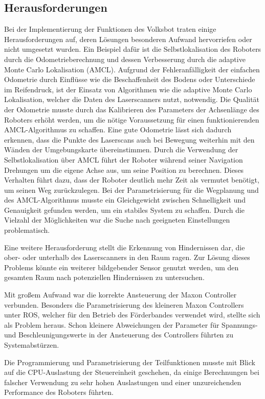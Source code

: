 \subsection{Herausforderungen}

Bei der Implementierung der Funktionen des Volksbot traten einige Herausforderungen auf, deren Lösungen besonderen Aufwand hervorriefen oder nicht umgesetzt wurden. Ein Beispiel dafür ist die Selbstlokalisation des Roboters durch die Odometrieberechnung und dessen Verbesserung durch die adaptive Monte Carlo Lokalisation (AMCL). Aufgrund der Fehleranfälligkeit der einfachen Odometrie durch Einflüsse wie die Beschaffenheit des Bodens oder Unterschiede im Reifendruck, ist der Einsatz von Algorithmen wie die adaptive Monte Carlo Lokalisation, welcher die Daten des Laserscanners nutzt, notwendig.  Die Qualität der Odometrie musste durch das Kalibrieren des Parameters der Achsenlänge des Roboters erhöht werden, um die nötige Voraussetzung für einen funktionierenden AMCL-Algorithmus zu schaffen. Eine gute Odometrie lässt sich dadurch erkennen, dass die Punkte des Laserscans auch bei Bewegung weiterhin mit den Wänden der Umgebungskarte übereinstimmen. Durch die Verwendung der Selbstlokalisation über AMCL führt der Roboter während seiner Navigation Drehungen um die eigene Achse aus, um seine Position zu berechnen. Dieses Verhalten führt dazu, dass der Roboter deutlich mehr Zeit als vermutet benötigt, um seinen Weg zurückzulegen. Bei der Parametrisierung für die Wegplanung und des AMCL-Algorithmus musste ein Gleichgewicht zwischen Schnelligkeit und Genauigkeit gefunden werden, um ein stabiles System zu schaffen. Durch die Vielzahl der Möglichkeiten war die Suche nach geeigneten Einstellungen problematisch.  

Eine weitere Herausforderung stellt die Erkennung von Hindernissen dar, die ober- oder unterhalb des Laserscanners in den Raum ragen. Zur Lösung dieses Problems könnte ein weiterer bildgebender Sensor genutzt werden, um den gesamten Raum nach potenziellen Hindernissen zu untersuchen.

Mit großem Aufwand war die korrekte Ansteuerung der Maxon Controller verbunden. Besonders die Parametrisierung des kleineren Maxon Controllers unter ROS, welcher für den Betrieb des Förderbandes verwendet wird, stellte sich als Problem heraus. Schon kleinere Abweichungen der Parameter für Spannungs- und Beschleunigungswerte in der Ansteuerung des Controllers führten zu Systemabstürzen.
 
Die Programmierung und Parametrisierung der Teilfunktionen musste mit Blick auf
die CPU-Auslastung der Steuereinheit geschehen, da einige Berechnungen bei falscher
Verwendung zu sehr hohen Auslastungen und einer unzureichenden Performance des
Roboters führten.




